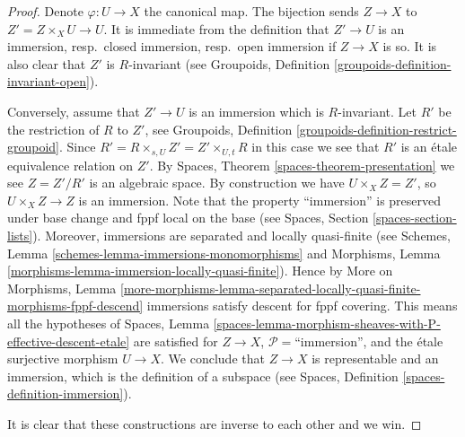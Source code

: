 \documentclass[10pt,a4paper]{amsart}
\theoremstyle{plain}
\theoremstyle{definition}
\theoremstyle{remark}
\numberwithin{equation}{subsection}
\begin{document}
\begin{proof}
Denote $\varphi : U \to X$ the canonical map. The bijection sends
$Z \to X$ to $Z' = Z \times_X U \to U$. It is immediate from the definition
that $Z' \to U$ is an immersion, resp.\ closed immersion, resp.\ open
immersion if $Z \to X$ is so. It is also clear that $Z'$ is $R$-invariant
(see Groupoids, Definition \ref{groupoids-definition-invariant-open}).

\medskip\noindent
Conversely, assume that $Z' \to U$ is an immersion which is $R$-invariant.
Let $R'$ be the restriction of $R$ to $Z'$, see
Groupoids, Definition \ref{groupoids-definition-restrict-groupoid}.
Since $R' = R \times_{s, U} Z' = Z' \times_{U, t} R$ in this case
we see that $R'$ is an \'etale equivalence relation on $Z'$. By
Spaces, Theorem \ref{spaces-theorem-presentation} we see
$Z = Z'/R'$ is an algebraic space. By construction we have
$U \times_X Z = Z'$, so $U \times_X Z \to Z$ is an immersion.
Note that the property ``immersion'' is preserved under base change
and fppf local on the base (see Spaces, Section \ref{spaces-section-lists}).
Moreover, immersions are separated and locally quasi-finite (see
Schemes, Lemma \ref{schemes-lemma-immersions-monomorphisms}
and
Morphisms, Lemma \ref{morphisms-lemma-immersion-locally-quasi-finite}).
Hence by More on Morphisms, Lemma
\ref{more-morphisms-lemma-separated-locally-quasi-finite-morphisms-fppf-descend}
immersions satisfy descent for fppf covering. This means all the hypotheses of
Spaces,
Lemma \ref{spaces-lemma-morphism-sheaves-with-P-effective-descent-etale}
are satisfied for $Z \to X$, $\mathcal{P}=$``immersion'',
and the \'etale surjective morphism $U \to X$. We conclude that $Z \to X$
is representable and an immersion, which is the
definition of a subspace (see
Spaces, Definition \ref{spaces-definition-immersion}).

\medskip\noindent
It is clear that these constructions are inverse to each other and we win.
\end{proof}
\end{document}
